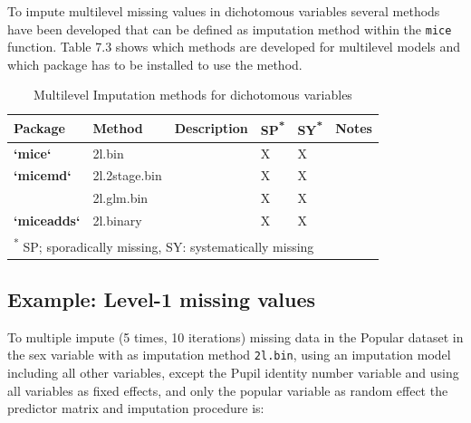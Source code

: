 \documentclass[
]{book}
\newenvironment{Shaded}{\begin{snugshade}}{\end{snugshade}}
\newcommand{\CommentTok}[1]{\textcolor[rgb]{0.56,0.35,0.01}{\textit{#1}}}
\newcommand{\DataTypeTok}[1]{\textcolor[rgb]{0.13,0.29,0.53}{#1}}
\newcommand{\DecValTok}[1]{\textcolor[rgb]{0.00,0.00,0.81}{#1}}
\newcommand{\KeywordTok}[1]{\textcolor[rgb]{0.13,0.29,0.53}{\textbf{#1}}}
\newcommand{\NormalTok}[1]{#1}
\newcommand{\OperatorTok}[1]{\textcolor[rgb]{0.81,0.36,0.00}{\textbf{#1}}}
\newcommand{\StringTok}[1]{\textcolor[rgb]{0.31,0.60,0.02}{#1}}
\begin{document}
To impute multilevel missing values in dichotomous variables several methods have been developed that can be defined as imputation method within the \texttt{mice} function. Table 7.3 shows which methods are developed for multilevel models and which package has to be installed to use the method.

\begin{table}

\caption{\label{tab:unnamed-chunk-115}Multilevel Imputation methods for dichotomous variables}
\centering
\begin{tabular}[t]{>{}l||>{}l||>{\raggedright\arraybackslash}p{20em}|>{}l||>{}l||>{\raggedright\arraybackslash}p{30em}}
\hline
Package & Method & Description & SP\textsuperscript{*} & SY\textsuperscript{*} & Notes\\
\hline
\textbf{`mice`} & 2l.bin & \cellcolor{white}{Generalized Linear Mixed model} & X & X & \cellcolor{white}{20-50 iterations are recommended and may be hard to run in small datasets}\\
\hline
\textbf{`micemd`} & 2l.2stage.bin & \cellcolor{white}{Generalized Linear Mixed model} & X & X & \cellcolor{white}{}\\
\hline
\textbf{} & 2l.glm.bin & \cellcolor{white}{Two-level model} & X & X & \cellcolor{white}{}\\
\hline
\textbf{`miceadds`} & 2l.binary & \cellcolor{white}{Generalized Linear Mixed model} & X & X & \cellcolor{white}{}\\
\hline
\multicolumn{6}{l}{\rule{0pt}{1em}\textsuperscript{*} SP; sporadically missing, SY: systematically missing}\\
\end{tabular}
\end{table}

\hypertarget{example-level-1-missing-values-1}{%
\subsection{Example: Level-1 missing values}\label{example-level-1-missing-values-1}}

To multiple impute (5 times, 10 iterations) missing data in the Popular dataset in the sex variable with as imputation method \texttt{2l.bin}, using an imputation model including all other variables, except the Pupil identity number variable and using all variables as fixed effects, and only the popular variable as random effect the predictor matrix and imputation procedure is:

\begin{Shaded}
\end{Shaded}
\end{document}
